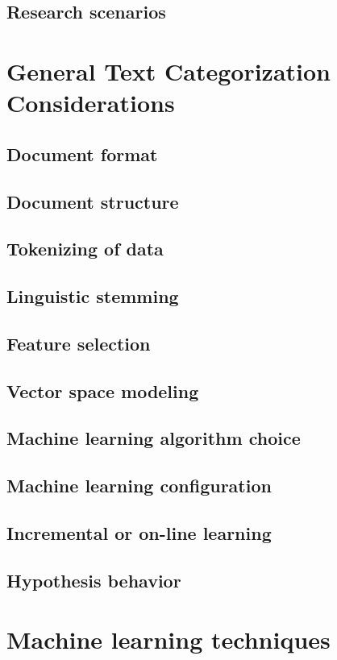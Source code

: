 \documentclass[a4paper]{report}
\begin{document}
\subsection{Research scenarios}

\section{General Text Categorization Considerations}
\subsection{Document format}
\subsection{Document structure}
\subsection{Tokenizing of data}
\subsection{Linguistic stemming}
\subsection{Feature selection}
\subsection{Vector space modeling}
\subsection{Machine learning algorithm choice}
\subsection{Machine learning configuration}
\subsection{Incremental or on-line learning}
\subsection{Hypothesis behavior}

\section{Machine learning techniques}
\end{document}
